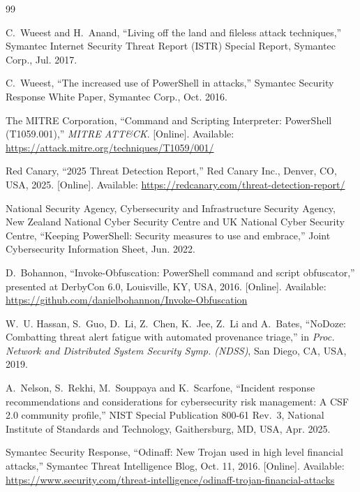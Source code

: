 \documentclass[12pt,a4paper]{article}
\begin{document}
\begin{thebibliography}{99}

 C.~Wueest and H.~Anand, ``Living off the land and fileless attack techniques,'' Symantec Internet Security Threat Report (ISTR) Special Report, Symantec Corp., Jul. 2017.

 C.~Wueest, ``The increased use of PowerShell in attacks,'' Symantec Security Response White Paper, Symantec Corp., Oct. 2016.

 The MITRE Corporation, ``Command and Scripting Interpreter: PowerShell (T1059.001),'' \emph{MITRE ATT\&CK}. [Online]. Available: \url{https://attack.mitre.org/techniques/T1059/001/}

 Red Canary, ``2025 Threat Detection Report,'' Red Canary Inc., Denver, CO, USA, 2025. [Online]. Available: \url{https://redcanary.com/threat-detection-report/}

 National Security Agency, Cybersecurity and Infrastructure Security Agency, New Zealand National Cyber Security Centre and UK National Cyber Security Centre, ``Keeping PowerShell: Security measures to use and embrace,'' Joint Cybersecurity Information Sheet, Jun. 2022.

 D.~Bohannon, ``Invoke-Obfuscation: PowerShell command and script obfuscator,'' presented at DerbyCon 6.0, Louisville, KY, USA, 2016. [Online]. Available: \url{https://github.com/danielbohannon/Invoke-Obfuscation}

 W.~U. Hassan, S.~Guo, D.~Li, Z.~Chen, K.~Jee, Z.~Li and A.~Bates, ``NoDoze: Combatting threat alert fatigue with automated provenance triage,'' in \emph{Proc. Network and Distributed System Security Symp. (NDSS)}, San Diego, CA, USA, 2019.

 A.~Nelson, S.~Rekhi, M.~Souppaya and K.~Scarfone, ``Incident response recommendations and considerations for cybersecurity risk management: A CSF 2.0 community profile,'' NIST Special Publication 800-61 Rev.~3, National Institute of Standards and Technology, Gaithersburg, MD, USA, Apr. 2025.

 Symantec Security Response, ``Odinaff: New Trojan used in high level financial attacks,'' Symantec Threat Intelligence Blog, Oct. 11, 2016. [Online]. Available: \url{https://www.security.com/threat-intelligence/odinaff-trojan-financial-attacks}


\end{thebibliography}
\end{document}

